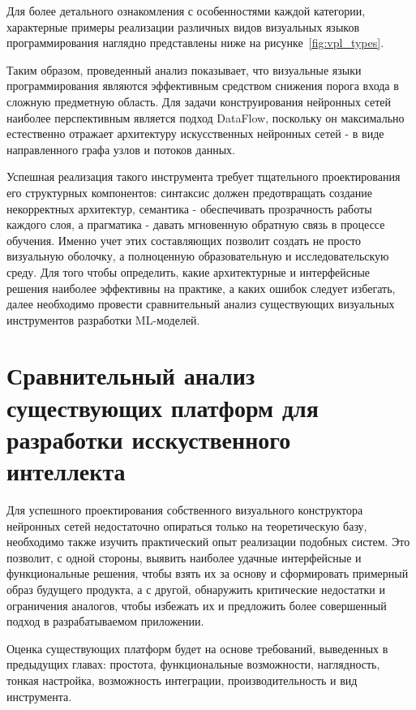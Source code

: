 \documentclass{report}
\begin{document}
\newpage Для более детального ознакомления с особенностями каждой категории, характерные примеры реализации различных видов визуальных языков программирования наглядно представлены ниже на рисунке~\ref{fig:vpl_types}.


Таким образом, проведенный анализ показывает, что визуальные языки программирования являются эффективным средством снижения порога входа в сложную предметную область. Для задачи конструирования нейронных сетей наиболее перспективным является подход DataFlow, поскольку он максимально естественно отражает архитектуру искусственных нейронных сетей - в виде направленного графа узлов и потоков данных.

Успешная реализация такого инструмента требует тщательного проектирования его структурных компонентов: синтаксис должен предотвращать создание некорректных архитектур, семантика - обеспечивать прозрачность работы каждого слоя, а прагматика - давать мгновенную обратную связь в процессе обучения. Именно учет этих составляющих позволит создать не просто визуальную оболочку, а полноценную образовательную и исследовательскую среду. Для того чтобы определить, какие архитектурные и интерфейсные решения наиболее эффективны на практике, а каких ошибок следует избегать, далее необходимо провести сравнительный анализ существующих визуальных инструментов разработки ML-моделей.


\section{Сравнительный анализ существующих платформ для разработки исскуственного интеллекта}

Для успешного проектирования собственного визуального конструктора нейронных сетей недостаточно опираться только на теоретическую базу, необходимо также изучить практический опыт реализации подобных систем. Это позволит, с одной стороны, выявить наиболее удачные интерфейсные и функциональные решения, чтобы взять их за основу и сформировать примерный образ будущего продукта, а с другой, обнаружить критические недостатки и ограничения аналогов, чтобы избежать их и предложить более совершенный подход в разрабатываемом приложении.

Оценка существующих платформ будет на основе требований, выведенных в предыдущих главах: простота, функциональные возможности, наглядность, тонкая настройка, возможность интеграции, производительность и вид инструмента.
\end{document}
